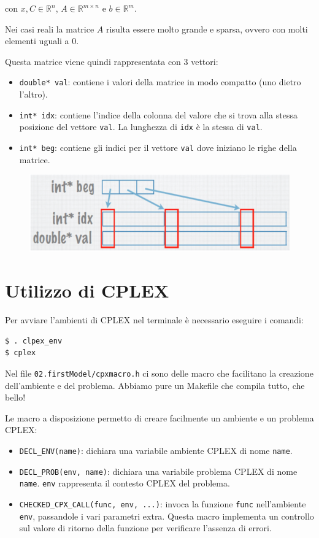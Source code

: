 \noindent con $x,C \in \mathbb{R}^n$, $A \in \mathbb{R}^{m \times n}$ e $b \in \mathbb{R}^m$.

Nei casi reali la matrice $A$ risulta essere molto grande e sparsa, ovvero con molti elementi uguali a 0.

Questa matrice viene quindi rappresentata con 3 vettori:

\begin{itemize}
	\item \texttt{double* val}: contiene i valori della matrice in modo compatto (uno dietro l'altro).
	\item \texttt{int* idx}: contiene l'indice della colonna del valore che si trova alla stessa posizione del vettore \texttt{val}. La lunghezza di \texttt{idx} è la stessa di \texttt{val}.
	\item \texttt{int* beg}: contiene gli indici per il vettore \texttt{val} dove iniziano le righe della matrice.
\end{itemize}

\begin{figure}[htbp]
	\centering
	\includegraphics[width=0.5\linewidth]{./images/lab1-matrix}
\end{figure}

\section{Utilizzo di CPLEX}

Per avviare l'ambienti di CPLEX nel terminale è necessario eseguire i comandi:

\begin{verbatim}
$ . clpex_env
$ cplex
\end{verbatim}

\noindent Nel file \texttt{02.firstModel/cpxmacro.h} ci sono delle macro che facilitano la creazione dell'ambiente e del problema.
Abbiamo pure un Makefile che compila tutto, che bello!

Le macro a disposizione permetto di creare facilmente un ambiente e un problema CPLEX:

\begin{itemize}
	\item \texttt{DECL\_ENV(name)}: dichiara una variabile ambiente CPLEX di nome \texttt{name}.
	\item \texttt{DECL\_PROB(env, name)}: dichiara una variabile problema CPLEX di nome \texttt{name}. \texttt{env} rappresenta il contesto CPLEX del problema.
	\item \texttt{CHECKED\_CPX\_CALL(func, env, ...)}: invoca la funzione \texttt{func} nell'ambiente \texttt{env}, passandole i vari parametri extra. Questa macro implementa un controllo sul valore di ritorno della funzione per verificare l'assenza di errori.
\end{itemize}


